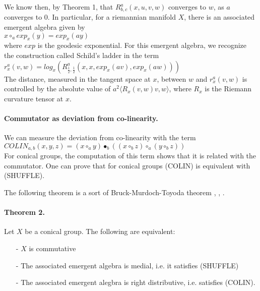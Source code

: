 \documentclass{article}
\begin{document}
We know then, by Theorem 1, that $\displaystyle R^{a}_{b,c}(x,u,v,w)$ converges to $w$, as $a$ converges to $0$. In particular, for a riemannian manifold $X$, there is an associated emergent algebra given by \\

$\displaystyle x \circ_{a} exp_{x}(y) = exp_{x}(ay)$ \\

\noindent where $exp$ is the geodesic exponential. For this emergent algebra, we recognize the construction called Schild's ladder in the term  \\ 

$\displaystyle r^{a}_{x}(v,w) = log_{x} \left( R^{a}_{\frac{1}{2}, \frac{1}{2}}(x,x, exp_{x}(av), exp_{x}(aw)) \right)$ \\ 

The distance, measured in the tangent space at $x$, between $w$ and $\displaystyle r^{a}_{x}(v,w)$ is controlled by the absolute value of $\displaystyle a^{2} \langle R_{x}(v,w)v,w\rangle$, where $\displaystyle R_{x}$ is the Riemann curvature tensor at $x$. 





\paragraph{Commutator as deviation from co-linearity.} We can measure the deviation from co-linearity with the term \\

$\displaystyle COLIN_{a,b}(x,y,z) =  (x \circ_{a} y) \bullet_{b} ((x \circ_{b} z) \circ_{a} (y \circ_{b} z))$ \\

For conical groups, the computation of this term shows that it is related with the commutator.  One can prove that for conical groups (COLIN) is equivalent with (SHUFFLE). 

The following theorem is a sort of Bruck-Murdoch-Toyoda theorem \cite{toyoda}, \cite{murdoch}, \cite{bruck}. 

\paragraph{Theorem 2.} Let $X$ be a conical group. The following are equivalent:
\begin{enumerate}
\item[-] $X$ is commutative

\item[-] The associated emergent algebra is medial, i.e. it satisfies (SHUFFLE) 

\item[-] The associated emergent alegbra is right distributive, i.e. satisfies (COLIN).   
\end{enumerate}
\end{document}
